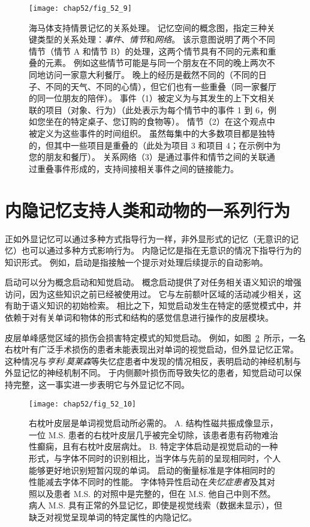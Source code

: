 \begin{figure}[htbp]
	\centering
	\texttt{[image: chap52/fig\_52\_9]}
	\caption{海马体支持情景记忆的关系处理。
		记忆空间的概念图，指定三种关键类型的关系处理：\textit{事件}、\textit{情节}和\textit{网络}。
		该示意图说明了两个不同情节（情节 A 和情节 B）的处理，这两个情节具有不同的元素和重叠的元素。
		例如这些情节可能是与同一个朋友在不同的晚上两次不同地访问一家意大利餐厅。
		晚上的经历是截然不同的（不同的日子、不同的天气、不同的心情），但它们也有一些重叠（同一家餐厅的同一位朋友的陪伴）。
		事件（1）被定义为与其发生的上下文相关联的项目（对象、行为）（此处表示为每个情节中的事件 1 到 6，例如您坐在的特定桌子、您订购的食物等）。
		情节（2）在这个观点中被定义为这些事件的时间组织。 虽然每集中的大多数项目都是独特的，但其中一些项目是重叠的（此处为项目 3 和项目 4；在示例中为您的朋友和餐厅）。
		关系网络（3）是通过事件和情节之间的关联通过重叠事件形成的，支持间接相关事件之间的链接能力\cite{eichenbaum2014can}。 }
	\label{fig:52_9}
\end{figure}



\section{内隐记忆支持人类和动物的一系列行为}

正如外显记忆可以通过多种方式指导行为一样，非外显形式的记忆（无意识的记忆）也可以通过多种方式影响行为。
内隐记忆是指在无意识的情况下指导行为的知识形式。
例如，启动是指接触一个提示对处理后续提示的自动影响。


启动可以分为概念启动和知觉启动。
概念启动提供了对任务相关语义知识的增强访问，因为这些知识之前已经被使用过。
它与左前额叶区域的活动减少相关，这有助于语义知识的初始检索。
相比之下，知觉启动发生在特定的感觉模式中，并依赖于对有关单词和物体的形式和结构的感觉信息进行操作的皮层模块。


皮层单峰感觉区域的损伤会损害特定模式的知觉启动。
例如，如图~\ref{fig:52_10}~所示，一名右枕叶有广泛手术损伤的患者未能表现出对单词的视觉启动，但外显记忆正常。
这种情况与\textit{亨利$\cdot$莫莱森}等失忆症患者中发现的情况相反，表明启动的神经机制与外显记忆的神经机制不同。
于内侧颞叶损伤而导致失忆的患者，知觉启动可以保持完整，这一事实进一步表明它与外显记忆不同。


\begin{figure}[htbp]
	\centering
	\texttt{[image: chap52/fig\_52\_10]}
	\caption{右枕叶皮层是单词视觉启动所必需的\cite{vaidya1998font}。
		A. 结构性磁共振成像显示，一位 M.S. 患者的右枕叶皮层几乎被完全切除，该患者患有药物难治性癫痫，且有右枕叶皮层病灶。
		B. 特定字体启动是视觉启动的一种形式，与字体不同时的识别相比，当字体与先前的呈现相同时，个人能够更好地识别短暂闪现的单词。
		启动的衡量标准是字体相同时的性能减去字体不同时的性能。
		字体特异性启动在\textit{失忆症患者}及其对照以及患者 M.S. 的对照中是完整的，但在 M.S. 他自己中则不然。
		病人 M.S. 具有正常的外显记忆，即使是视觉线索（数据未显示），但缺乏对视觉呈现单词的特定属性的内隐记忆。}
	\label{fig:52_10}
\end{figure}



